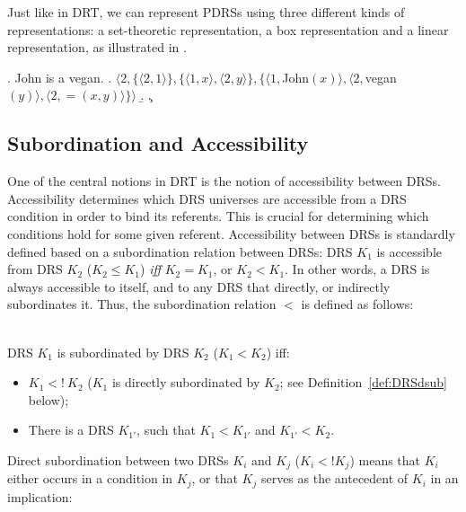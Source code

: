 Just like in DRT, we can represent PDRSs using three different kinds of
representations: a set-theoretic representation, a box representation
and a linear representation, as illustrated in \Next.

\ex. John is a vegan.
\a. $\langle 2, \{\langle 2,1\rangle\}, \{\langle 1, x\rangle, 
      \langle 2, y\rangle\},\{\langle1, $John$(x)\rangle,\langle2, 
      $vegan$(y)\rangle, \langle 2, =(x,y)\rangle\}\rangle$
\b. 
\c. 


\subsection{Subordination and Accessibility}

One of the central notions in DRT is the notion of accessibility between
DRSs. Accessibility determines which DRS universes are accessible from a DRS
condition in order to bind its referents. This is crucial for determining
which conditions hold for some given referent.  Accessibility between DRSs
is standardly defined based on a subordination relation between DRSs: DRS
$K_1$ is accessible from DRS $K_2$ ($K_2 \leq K_1$) \textit{iff} $K_2
= K_1$, or $K_2 < K_1$. In other words, a DRS is always accessible to
itself, and to any DRS that directly, or indirectly subordinates it. Thus,
the subordination relation $<$ is defined as follows:

\begin{definition}\label{def:DRSsub}~\\
DRS $K_1$ is subordinated by DRS $K_2$ ($K_1 < K_2$) iff:
  \begin{itemize}
    \item $K_1 <!~K_2$ 
      ($K_1$ is directly subordinated by $K_2$; see Definition~\ref{def:DRSdsub} below);
    \item There is a DRS $K_{1'}$, such that $K_1 < K_{1'}$  and $K_{1'} < K_2$.
  \end{itemize}
\end{definition}

\noindent Direct subordination between two DRSs $K_i$ and $K_j$ ($K_i <!
K_j$) means that $K_i$ either occurs in a condition in $K_j$, or that $K_j$
serves as the antecedent of $K_i$ in an implication:

